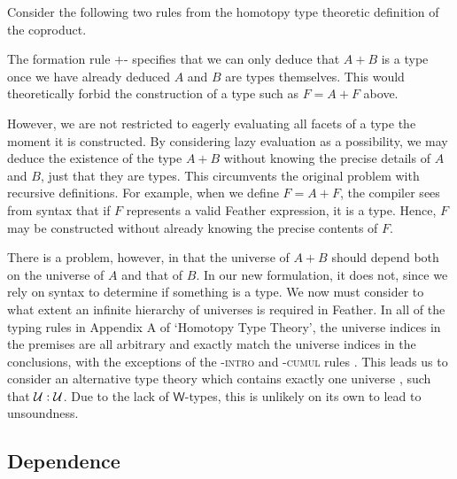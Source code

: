 \documentclass[11pt]{book}
\begin{document}
Consider the following two rules from the homotopy type theoretic definition of the coproduct.
The formation rule \( + \)-\rform{} specifies that we can only deduce that \( A+B \) is a type once we have already deduced \( A \) and \( B \) are types themselves.
This would theoretically forbid the construction of a type such as \( F = A + F \) above.

However, we are not restricted to eagerly evaluating all facets of a type the moment it is constructed.
By considering lazy evaluation as a possibility, we may deduce the existence of the type \( A+B \) without knowing the precise details of \( A \) and \( B \), just that they are types.
This circumvents the original problem with recursive definitions.
For example, when we define \( F = A + F \), the compiler sees from syntax that if \( F \) represents a valid Feather expression, it is a type.
Hence, \( F \) may be constructed without already knowing the precise contents of \( F \).

There is a problem, however, in that the universe of \( A + B \) should depend both on the universe of \( A \) and that of \( B \).
In our new formulation, it does not, since we rely on syntax to determine if something is a type.
We now must consider to what extent an infinite hierarchy of universes is required in Feather.
In all of the typing rules in Appendix A of `Homotopy Type Theory', the universe indices in the premises are all arbitrary and exactly match the universe indices in the conclusions, with the exceptions of the \UU-\textsc{intro} and \UU-\textsc{cumul} rules \cite{hottbook}.
This leads us to consider an alternative type theory which contains exactly one universe \UU{}, such that \( \mathcal{U} : \mathcal{U} \).
Due to the lack of \( \mathsf{W} \)-types, this is unlikely on its own to lead to unsoundness.

\subsection{Dependence}
\end{document}
